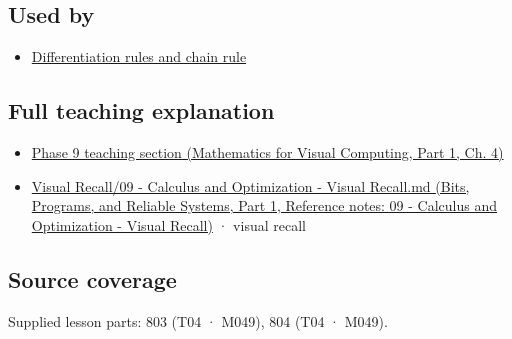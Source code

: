 \subsection{Used by}\label{appendix-fecc1847f5a3-used-by}

\hypertarget{appendix-fecc1847f5a3-used-by}{}

\begin{itemize}
\tightlist
\item
  \hyperref[appendix-d9f70bdfbc92]{Differentiation rules and chain rule}
\end{itemize}

\subsection{Full teaching explanation}\label{appendix-fecc1847f5a3-full-teaching-explanation}

\hypertarget{appendix-fecc1847f5a3-full-teaching-explanation}{}

\begin{itemize}
\tightlist
\item
  \href{../02-Mathematics-for-Visual-Computing-P01/main.pdf\#01-foundations-i-ch020-functions-limits-continuity-and-scalar-change}{Phase 9 teaching section (Mathematics for Visual Computing, Part 1, Ch. 4)}
\item
  \href{../01-Bits-Programs-and-Reliable-Systems-P01/main.pdf\#appendix-adf48f5dc5c1}{Visual Recall/09 - Calculus and Optimization - Visual Recall.md (Bits, Programs, and Reliable Systems, Part 1, Reference notes: 09 - Calculus and Optimization - Visual Recall)} · visual recall
\end{itemize}

\subsection{Source coverage}\label{appendix-fecc1847f5a3-source-coverage}

\hypertarget{appendix-fecc1847f5a3-source-coverage}{}

Supplied lesson parts: 803 (T04 · M049), 804 (T04 · M049).
